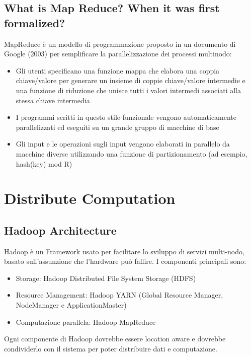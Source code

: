 \documentclass{article}
\begin{document}
\subsection{What is Map Reduce? When it was first formalized?}
MapReduce è un modello di programmazione proposto in un documento di Google (2003) per semplificare la parallelizzazione dei processi multinodo:
\begin{itemize}
    \item Gli utenti specificano una funzione mappa che elabora una coppia chiave/valore per generare un insieme di coppie chiave/valore intermedie e una funzione di riduzione che unisce tutti i valori intermedi associati alla stessa chiave intermedia
    \item I programmi scritti in questo stile funzionale vengono automaticamente parallelizzati ed eseguiti su un grande gruppo di macchine di base
    \item Gli input e le operazioni sugli input vengono elaborati in parallelo da macchine diverse utilizzando una funzione di partizionamento (ad esempio, hash(key) mod R)
    
\end{itemize}

\section{Distribute Computation}
\subsection{Hadoop Architecture}
Hadoop è un Framework usato per facilitare lo sviluppo di servizi multi-nodo, basato sull'assunzione che l'hardware può fallire.
I componenti principali sono:
\begin{itemize}
    \item Storage: Hadoop Distributed File System Storage (HDFS)
    \item Resource Management: Hadoop YARN (Global Resource Manager, NodeManager e ApplicationMaster)
    \item Computazione parallela: Hadoop MapReduce
\end{itemize}

Ogni componente di Hadoop dovrebbe essere location aware e dovrebbe condividerlo con il sistema per poter distribuire dati e computazione.
\end{document}
